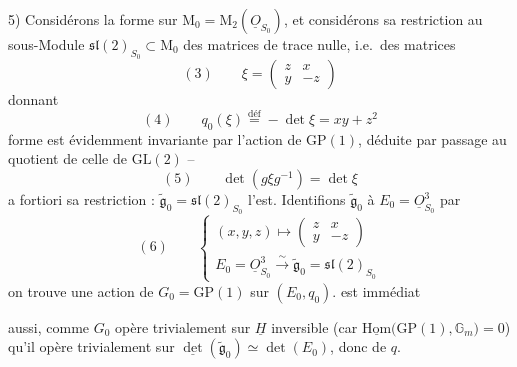 \documentclass[11pt,a4paper]{article}
\begin{document}
5) Considérons la forme  \add{$\xi \mapsto -\det(\xi)$} sur
$\mathrm{M}_0 = \mathrm{M}_2(\underline{O}_{S_0})$, et considérons sa restriction
au sous-Module $\mathfrak{sl}(2)_{S_0} \subset \mathrm{M}_0$ des matrices de trace
nulle,  i.e.\ des matrices
\[
  (3) \qquad \xi = \begin{pmatrix} z & x \\ y & -z \end{pmatrix}
\]
donnant
\[
  (4) \qquad q_0(\xi) \overset{\mathrm{déf}}{=} -\det \xi = xy + z^2
\]
 forme 
est évidemment invariante par l'action de $\mathrm{GP}(1)$, déduite par passage
au quotient de celle de $\mathrm{GL}(2)$ -- \ill{}
\[
  (5) \qquad \det(g \xi g^{-1}) = \det \xi
\]
a fortiori sa restriction : $\widetilde{\mathfrak{g}}_0 = \mathfrak{sl}(2)_{S_0}$
l'est. Identifions $\widetilde{\mathfrak{g}}_0$ à $E_0 = \underline{O}^3_{S_0}$ par
\[
  (6) \qquad \left\lbrace
  \begin{array}{l}
    (x, y, z) \longmapsto \begin{pmatrix} z & x \\ y & -z \end{pmatrix} \\[4pt]
    E_0 = \underline{O}^3_{S_0} \xrightarrow{\ \sim\ } \widetilde{\mathfrak{g}}_0 = \mathfrak{sl}(2)_{S_0}
  \end{array}\right.
\]
on trouve une action de $G_0 = \mathrm{GP}(1)$ sur $(E_0, q_0)$.  est immédiat

aussi, comme $G_0$ opère trivialement sur $\underline{H}$ 
inversible (car $\underline{\mathrm{Hom}}\bigl(\mathrm{GP}(1), \mathbb{G}_m\bigr) = 0$)
qu'il opère trivialement sur $\underline{\det}(\widetilde{\mathfrak{g}}_0) \simeq
\det(E_0)$, donc \uncertain{\ill{}}    de $q$.
\end{document}
